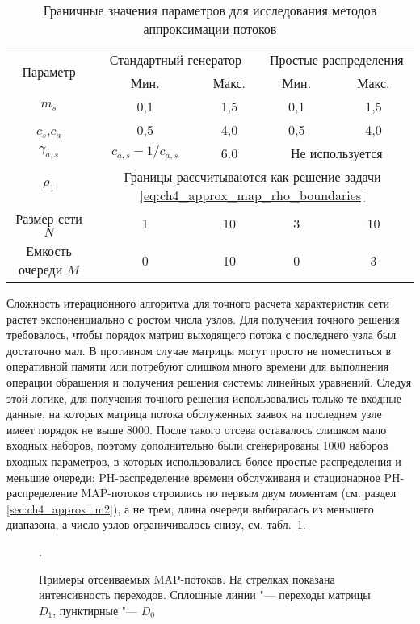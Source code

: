 \begin{table}[h]
  \centering
  \caption{\label{tab:ch4_results_approx_input_range} Граничные значения параметров для исследования методов аппроксимации потоков}
  \begin{tabular}{|c|cc|cc|}
    \hline
    \multirow{2}{*}{Параметр}
      &\multicolumn{2}{c|}{Стандартный генератор}&\multicolumn{2}{c|}{Простые распределения}\\
                    &Мин.   &Макс.    &Мин.   &Макс.\\
      \hline
      $m_s$           &0,1       &1,5        &0,1        &1,5\\
      $c_s$,$c_a$     &0,5       &4,0        &0,5        &4,0\\
      $\gamma_{a,s}$  &$c_{a,s} - 1/c_{a,s}$ &6.0    &\multicolumn{2}{c|}{Не используется}\\
    $\rho_1$        &\multicolumn{4}{c|}{Границы рассчитываются как решение задачи
      \eqref{eq:ch4_approx_map_rho_boundaries}}\\
    Размер сети $N$ &1          &10        &3           &10\\
    Емкость очереди $M$ &0      &10        &0           &3\\
    \hline
  \end{tabular}
\end{table}


Сложность итерационного алгоритма для точного расчета характеристик сети растет экспоненциально с ростом числа узлов. Для получения точного решения требовалось, чтобы порядок матриц выходящего потока с последнего узла был достаточно мал. В противном случае матрицы могут просто не поместиться в оперативной памяти или потребуют слишком много времени для выполнения операции обращения и получения решения системы линейных уравнений. Следуя этой логике, для получения точного решения использовались только те входные данные, на которых матрица потока обслуженных заявок на последнем узле имеет порядок не выше 8000. После такого отсева оставалось слишком мало входных наборов, поэтому дополнительно были сгенерированы 1000 наборов входных параметров, в которых использовались более простые распределения и меньшие очереди: PH-распределение времени обслуживаня и стационарное PH-распределение MAP-потоков строились по первым двум моментам (см. раздел \ref{sec:ch4_approx_m2}), а не трем, длина очереди выбиралась из меньшего диапазона, а число узлов ограничивалось снизу, см. табл.~\ref{tab:ch4_results_approx_input_range}.

\begin{figure}[h]
  \caption{Примеры отсеиваемых MAP-потоков. На стрелках показана интенсивность переходов. Сплошные линии "--- переходы матрицы $D_1$, пунктирные "--- $D_0$}.\label{fig:ch4_results_bad_maps}
\end{figure}

